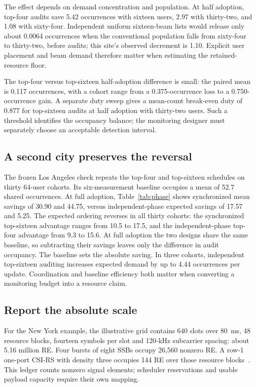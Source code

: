 \documentclass[journal,10pt]{IEEEtran}
\begin{document}
The effect depends on demand concentration and population. At half adoption, top-four audits save 5.42 occurrences with sixteen users, 2.97 with thirty-two, and 1.08 with sixty-four. Independent uniform sixteen-beam lists would release only about 0.0064 occurrences when the conventional population falls from sixty-four to thirty-two, before audits; this site's observed decrement is 1.10. Explicit user placement and beam demand therefore matter when estimating the retained-resource floor.

The top-four versus top-sixteen half-adoption difference is small: the paired mean is 0.117 occurrences, with a cohort range from a 0.375-occurrence loss to a 0.750-occurrence gain. A separate duty sweep gives a mean-count break-even duty of 0.877 for top-sixteen audits at half adoption with thirty-two users. Such a threshold identifies the occupancy balance; the monitoring designer must separately choose an acceptable detection interval.

\subsection{A second city preserves the reversal}
The frozen Los Angeles check repeats the top-four and top-sixteen schedules on thirty 64-user cohorts. Its six-measurement baseline occupies a mean of 52.7 shared occurrences. At full adoption, Table~\ref{tab:phase} shows synchronized mean savings of 30.90 and 44.75, versus independent-phase expected savings of 17.57 and 5.25. The expected ordering reverses in all thirty cohorts: the synchronized top-sixteen advantage ranges from 10.5 to 17.5, and the independent-phase top-four advantage from 9.3 to 15.6. At full adoption the two designs share the same baseline, so subtracting their savings leaves only the difference in audit occupancy. The baseline sets the absolute saving. In three cohorts, independent top-sixteen auditing increases expected demand by up to 4.44 occurrences per update. Coordination and baseline efficiency both matter when converting a monitoring budget into a resource claim.

\subsection{Report the absolute scale}
For the New York example, the illustrative grid contains 640 slots over 80~ms, 48 resource blocks, fourteen symbols per slot and 120-kHz subcarrier spacing: about 5.16 million RE. Four bursts of eight SSBs occupy 26,560 nonzero RE. A row-1 one-port CSI-RS with density three occupies 144 RE over those resource blocks~\cite{ts38211}. This ledger counts nonzero signal elements; scheduler reservations and usable payload capacity require their own mapping.
\end{document}
